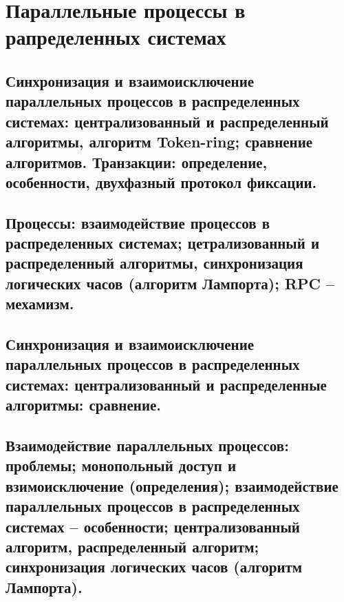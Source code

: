\section{Параллельные процессы в рапределенных системах}

\subsection{Синхронизация и взаимоисключение параллельных процессов в распределенных системах: централизованный и распределенный алгоритмы, алгоритм Token-ring; сравнение алгоритмов. Транзакции: определение, особенности, двухфазный протокол фиксации.}

\newpage

\subsection{Процессы: взаимодействие процессов в распределенных системах; цетрализованный и распределенный алгоритмы, синхронизация логических часов (алгоритм Лампорта); RPC – мехамизм.}

\newpage

\subsection{Синхронизация и взаимоисключение параллельных процессов в распределенных системах: централизованный и распределенные алгоритмы: сравнение.}

\newpage

\subsection{Взаимодействие параллельных процессов: проблемы; монопольный доступ и взимоисключение (определения); взаимодействие параллельных процессов в распределенных системах – особенности; централизованный алгоритм, распределенный алгоритм; синхронизация логических часов (алгоритм Лампорта).}
